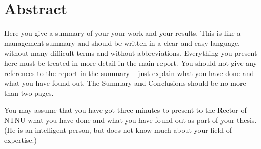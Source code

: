 \section*{Abstract}
Here you give a summary of your your work and your results. This is like a management summary and should be written in a clear and easy language, without many difficult terms and without abbreviations. Everything you present here must be treated in more detail in the main report. You should not give any references to the report in the summary -- just explain what you have done and what you have found out. The Summary and Conclusions should be no more than two pages.

You may assume that you have got three minutes to present to the Rector of NTNU  what you have done and what you have found out as part of your thesis. (He is an intelligent person, but does not know much about your field of expertise.)